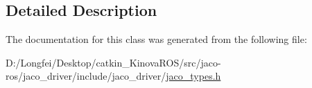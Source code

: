 \subsection{Detailed Description}


The documentation for this class was generated from the following file\+:\begin{DoxyCompactItemize}
\item 
D\+:/\+Longfei/\+Desktop/catkin\+\_\+\+Kinova\+R\+O\+S/src/jaco-\/ros/jaco\+\_\+driver/include/jaco\+\_\+driver/\hyperlink{jaco__types_8h}{jaco\+\_\+types.\+h}\end{DoxyCompactItemize}
